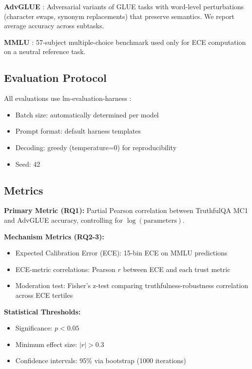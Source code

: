 \textbf{AdvGLUE} \cite{wang2022advglue}: Adversarial variants of GLUE tasks with word-level perturbations (character swaps, synonym replacements) that preserve semantics. We report average accuracy across subtasks.

\textbf{MMLU} \cite{hendrycks2021mmlu}: 57-subject multiple-choice benchmark used only for ECE computation on a neutral reference task.

\subsection{Evaluation Protocol}

All evaluations use lm-evaluation-harness \cite{gao2023lmeval}:
\begin{itemize}
    \item Batch size: automatically determined per model
    \item Prompt format: default harness templates
    \item Decoding: greedy (temperature=0) for reproducibility
    \item Seed: 42
\end{itemize}

\subsection{Metrics}

\textbf{Primary Metric (RQ1):} Partial Pearson correlation between TruthfulQA MC1 and AdvGLUE accuracy, controlling for $\log(\text{parameters})$.

\textbf{Mechanism Metrics (RQ2-3):}
\begin{itemize}
    \item Expected Calibration Error (ECE): 15-bin ECE on MMLU predictions
    \item ECE-metric correlations: Pearson $r$ between ECE and each trust metric
    \item Moderation test: Fisher's z-test comparing truthfulness-robustness correlation across ECE tertiles
\end{itemize}

\textbf{Statistical Thresholds:}
\begin{itemize}
    \item Significance: $p < 0.05$
    \item Minimum effect size: $|r| > 0.3$
    \item Confidence intervals: 95\% via bootstrap (1000 iterations)
\end{itemize}

